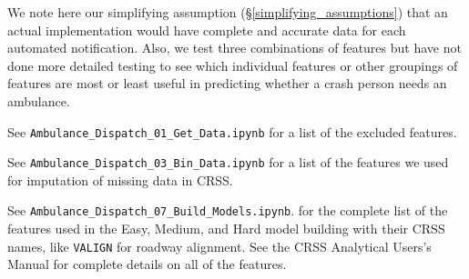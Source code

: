     



We note here our simplifying assumption (\S \ref{simplifying_assumptions}) that an actual implementation would have complete and accurate data for each automated notification.  Also, we test three combinations of features but have not done more detailed testing to see which individual features or other groupings of features are most or least useful in predicting whether a crash person needs an ambulance.  

See 
\verb|Ambulance_Dispatch_01_Get_Data.ipynb|  
for a list of the excluded features.

See \verb|Ambulance_Dispatch_03_Bin_Data.ipynb|
for a list of the features we used for imputation of missing data in CRSS.


See
\verb|Ambulance_Dispatch_07_Build_Models.ipynb|.
for the complete list of the features used in the Easy, Medium, and Hard model building with their CRSS names, like \verb|VALIGN| for roadway alignment. See the CRSS Analytical Users's Manual for complete details on all of the features. \citep{CRSS} 


